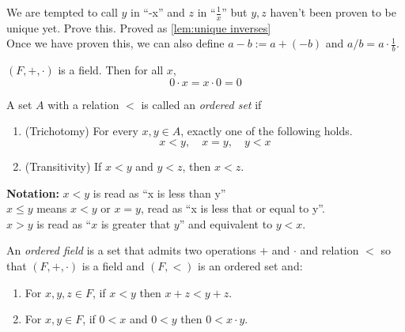 \documentclass[12pt]{article}
\begin{document}
\begin{rem}
    We are tempted to call $y$ in  ``-x'' and $z$ in  ``$\frac{1}{x}$'' but $y, z$ haven't been proven to be unique yet. \textcolor{red!85!black}{Prove this}. \textcolor{green!30!black}{Proved as \cref{lem:unique inverses}} \\
    Once we have proven this, we can also define $a - b := a + (-b)$ and $a/b = a \cdot \frac{1}{b}$.
\end{rem}

\begin{thm} \label{thm:0x=0}
    $(F, +, \cdot)$ is a field. Then for all $x$, \[
        0 \cdot x = x \cdot 0 = 0
    \]
\end{thm}

\begin{defn} \label{defn:ordered set}
    A set $A$ with a relation $<$ is called an \emph{ordered set} if
    \begin{enumerate}[label=(O\arabic*)]
        \item \label{order:trichotomy}
            (Trichotomy) For every $x, y \in A$, exactly one of the following holds. \[
                x < y, \quad x = y, \quad y < x
            \]
        \item \label{order:transitivity}
            (Transitivity) If $x < y$ and $y < z$, then $x < z$.
        \setcounter{temp}{\value{enumi}}
    \end{enumerate}
    \textbf{Notation:} $x < y$ is read as ``x is less than y'' \\
    $x \leq y$ means $x < y$ or $x = y$, read as ``x is less that or equal to y''. \\
    $x > y$ is read as ``$x$ is greater that $y$'' and equivalent to $y < x$.
\end{defn}

\begin{defn} \label{defn:ordered field}
    An \emph{ordered field} is a set that admits two operations $+$ and $\cdot$ and relation $<$ so that $(F, +, \cdot)$ is a field and $(F, <)$ is an ordered set and:
    \begin{enumerate}[label=(O\arabic*)]
        \setcounter{enumi}{\value{temp}}
        \item \label{order:addn preserves}
            For $x, y, z \in F$, if $x < y$ then $x + z < y + z$.
        \item \label{order:mult preserves}
            For $x, y \in F$, if $0 < x$ and $0 < y$ then $0 < x \cdot y$.
    \end{enumerate}
\end{defn}
\end{document}
